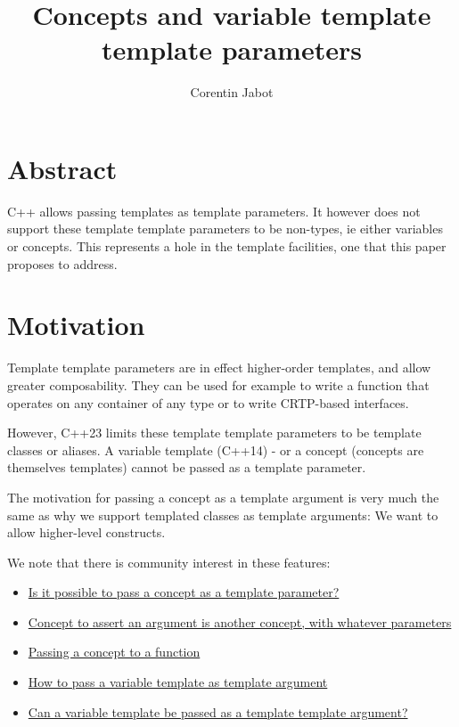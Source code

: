 \documentclass{wg21}
\title{Concepts and variable template template parameters}
\author{Corentin Jabot}{corentin.jabot@gmail.com}
\begin{document}
\maketitle

\section{Abstract}

C++ allows passing templates as template parameters.
It however does not support these template template parameters to be non-types, ie either variables or concepts.
This represents a hole in the template facilities, one that this paper proposes to address.

\section{Motivation}

Template template parameters are in effect higher-order templates, and allow greater composability.
They can be used for example to write a function that operates on any container of any type or to write CRTP-based interfaces.

However, C++23 limits these template template parameters to be template classes or aliases.
A variable template (C++14) - or a concept (concepts are themselves templates) cannot be passed as a template parameter.

The motivation for passing a concept as a template argument is very much the same as why we support templated classes as template arguments:
We want to allow higher-level constructs.

We note that there is community interest in these features:

\begin{itemize}
\item \href{https://stackoverflow.com/questions/63098070/is-it-possible-to-pass-a-concept-as-a-template-parameter}{Is it possible to pass a concept as a template parameter?}
\item \href{https://stackoverflow.com/questions/72488554/concept-to-assert-an-argument-is-another-concept-with-whatever-parameters?noredirect=1&lq=1}{Concept to assert an argument is another concept, with whatever parameters}
\item \href{https://stackoverflow.com/questions/58875829/passing-a-concept-to-a-function}{Passing a concept to a function}
\item \href{https://stackoverflow.com/questions/61664468/how-to-pass-a-variable-template-as-template-argument}{How to pass a variable template as template argument}
\item \href{https://stackoverflow.com/questions/58592312/can-a-variable-template-be-passed-as-a-template-template-argument}{Can a variable template be passed as a template template argument?}
\end{itemize}
\end{document}
